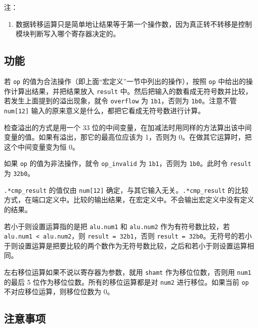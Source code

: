 \documentclass[12pt,AutoFakeBold,AutoFakeSlant]{article}
\providecommand{\tightlist}{%
  \setlength{\itemsep}{0pt}\setlength{\parskip}{0pt}}
\begin{document}
注：

\begin{enumerate}
\def\labelenumi{\arabic{enumi}.}
\tightlist
\item
  数据转移运算只是简单地让结果等于第一个操作数，因为真正转不转移是控制模块判断写入哪个寄存器决定的。
\end{enumerate}

\hypertarget{ux529fux80fd-7}{%
\subsection{功能}\label{ux529fux80fd-7}}

若 \texttt{op} 的值为合法操作（即上面``宏定义''一节中列出的操作），按照
\texttt{op} 中给出的操作计算出结果，并把结果放入 \texttt{result}
中。然后把输入的数看成无符号数并比较，若发生上面提到的溢出现象，就令
\texttt{overflow} 为 \texttt{1\textquotesingle{}b1}，否则为
\texttt{1\textquotesingle{}b0}。注意不管 \texttt{num{[}12{]}}
输入的原来意义是什么，都把它看成无符号数进行计算。

检查溢出的方式是用一个 33
位的中间变量，在加减法时用同样的方法算出该中间变量的值。如果有溢出，那它的最高位应该为
1，否则为 0。在做其它运算时，把这个中间变量变为恒 0。

如果 \texttt{op} 的值为非法操作，就令 \texttt{op\_invalid} 为
\texttt{1\textquotesingle{}b1}，否则为
\texttt{1\textquotesingle{}b0}。此时令 \texttt{result} 为
\texttt{32\textquotesingle{}b0}。

\texttt{.*cmp\_result} 的值仅由 \texttt{num{[}12{]}}
确定，与其它输入无关。\texttt{.*cmp\_result}
的比较方式，在端口定义中。比较的输出结果，在宏定义中。不会输出宏定义中没有定义的结果。

若小于则设置运算指的是把 \texttt{alu.num1} 和 \texttt{alu.num2}
作为有符号数比较，若 \texttt{alu.num1\ \textless{}\ alu.num2}，则
\texttt{result\ =\ 32\textquotesingle{}b1}，否则
\texttt{result\ =\ 32\textquotesingle{}b0}。无符号的若小于则设置运算是把要比较的两个数作为无符号数比较，之后和若小于则设置运算相同。

左右移位运算如果不说以寄存器为参数，就用 \texttt{shamt}
作为移位位数，否则用 \texttt{num1} 的最后 5
位作为移位位数。所有的移位运算都是对 \texttt{num2} 进行移位。如果当前
\texttt{op} 不对应移位运算，则移位位数为 0。

\hypertarget{ux6ce8ux610fux4e8bux9879-4}{%
\subsection{注意事项}\label{ux6ce8ux610fux4e8bux9879-4}}
\end{document}
